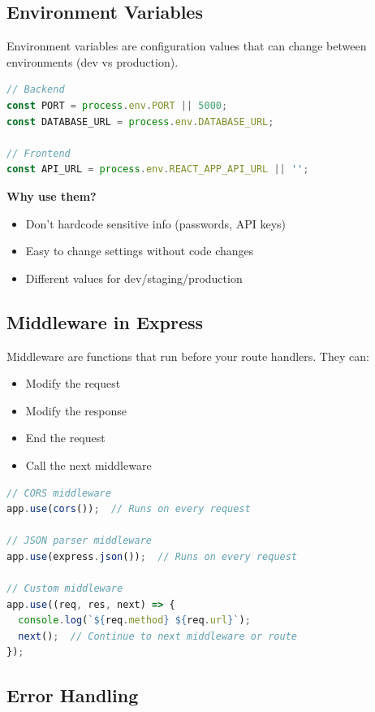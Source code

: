 \documentclass[12pt,a4paper]{article}
\begin{document}
\subsection{Environment Variables}

Environment variables are configuration values that can change between environments (dev vs production).

\begin{lstlisting}[language=JavaScript, caption=Using environment variables]
// Backend
const PORT = process.env.PORT || 5000;
const DATABASE_URL = process.env.DATABASE_URL;

// Frontend
const API_URL = process.env.REACT_APP_API_URL || '';
\end{lstlisting}

\textbf{Why use them?}
\begin{itemize}
    \item Don't hardcode sensitive info (passwords, API keys)
    \item Easy to change settings without code changes
    \item Different values for dev/staging/production
\end{itemize}

\subsection{Middleware in Express}

Middleware are functions that run before your route handlers. They can:
\begin{itemize}
    \item Modify the request
    \item Modify the response
    \item End the request
    \item Call the next middleware
\end{itemize}

\begin{lstlisting}[language=JavaScript, caption=Middleware example]
// CORS middleware
app.use(cors());  // Runs on every request

// JSON parser middleware
app.use(express.json());  // Runs on every request

// Custom middleware
app.use((req, res, next) => {
  console.log(`${req.method} ${req.url}`);
  next();  // Continue to next middleware or route
});
\end{lstlisting}

\subsection{Error Handling}
\end{document}
